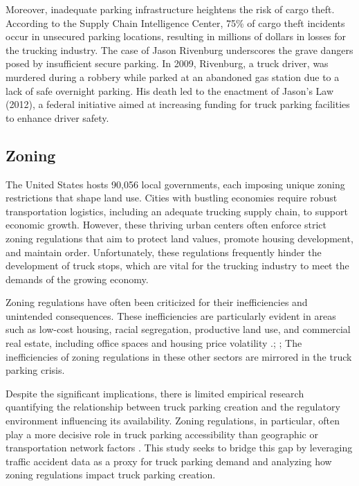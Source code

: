 \documentclass[
  12pt]{article}
\begin{document}
Moreover, inadequate parking infrastructure heightens the risk of cargo
theft. According to the Supply Chain Intelligence Center, 75\% of cargo
theft incidents occur in unsecured parking locations, resulting in
millions of dollars in losses for the trucking industry. The case of
Jason Rivenburg underscores the grave dangers posed by insufficient
secure parking. In 2009, Rivenburg, a truck driver, was murdered during
a robbery while parked at an abandoned gas station due to a lack of safe
overnight parking. His death led to the enactment of Jason's Law (2012),
a federal initiative aimed at increasing funding for truck parking
facilities to enhance driver safety.

\subsection{Zoning}\label{zoning}

The United States hosts 90,056 local governments, each imposing unique
zoning restrictions that shape land use. Cities with bustling economies
require robust transportation logistics, including an adequate trucking
supply chain, to support economic growth. However, these thriving urban
centers often enforce strict zoning regulations that aim to protect land
values, promote housing development, and maintain order. Unfortunately,
these regulations frequently hinder the development of truck stops,
which are vital for the trucking industry to meet the demands of the
growing economy.

Zoning regulations have often been criticized for their inefficiencies
and unintended consequences. These inefficiencies are particularly
evident in areas such as low-cost housing, racial segregation,
productive land use, and commercial real estate, including office spaces
and housing price volatility
\citet{glaeserImpactBuildingRestrictions2003}.;
\citet{galeReviewColorLaw2019}; \citet{PDFTriumphCity2024} The
inefficiencies of zoning regulations in these other sectors are mirrored
in the truck parking crisis.

Despite the significant implications, there is limited empirical
research quantifying the relationship between truck parking creation and
the regulatory environment influencing its availability. Zoning
regulations, in particular, often play a more decisive role in truck
parking accessibility than geographic or transportation network factors
\citep{shertzerZoningEconomicGeography2018}. This study seeks to bridge
this gap by leveraging traffic accident data as a proxy for truck
parking demand and analyzing how zoning regulations impact truck parking
creation.
\end{document}
